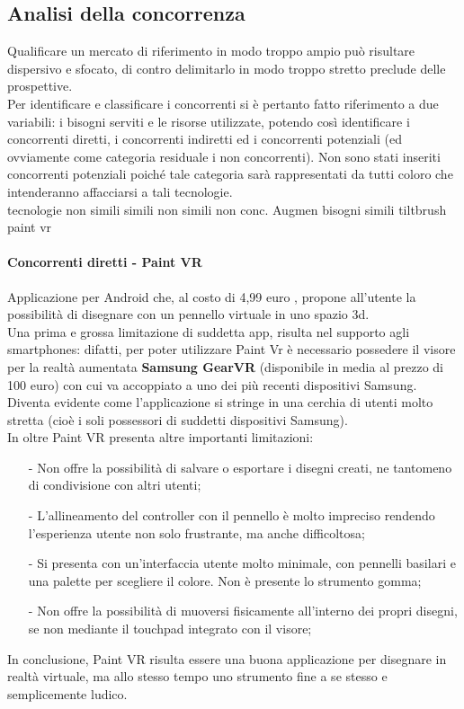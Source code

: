 \documentclass[11pt,fleqn]{book} %
\begin{document}
\subsection{Analisi della concorrenza}
Qualificare un mercato di riferimento in modo troppo ampio può risultare dispersivo e
sfocato, di contro delimitarlo in modo troppo stretto preclude delle prospettive. \\Per
identificare e classificare i concorrenti si è pertanto fatto riferimento a due variabili: i
bisogni serviti e le risorse utilizzate, potendo così identificare i concorrenti diretti, i
concorrenti indiretti ed i concorrenti potenziali (ed ovviamente come categoria residuale
i non concorrenti). Non sono stati inseriti concorrenti potenziali poiché tale categoria sarà
rappresentati da tutti coloro che intenderanno affacciarsi a tali tecnologie.\\
\newpage
						tecnologie
 			  	non simili		simili
	non simili	non conc.		Augmen								
bisogni
		simili	tiltbrush 		paint vr
	
				
\paragraph{Concorrenti diretti - Paint VR}
Applicazione per Android che, al costo di 4,99 euro , propone all'utente la possibilità di disegnare con un pennello virtuale in uno spazio 3d.\\
Una prima e grossa limitazione di suddetta app, risulta nel supporto agli smartphones: difatti, per poter utilizzare Paint Vr è necessario possedere il visore per la realtà aumentata \textbf{Samsung GearVR} (disponibile in media al prezzo di 100 euro) con cui va accoppiato a uno dei più recenti dispositivi Samsung. Diventa evidente come l'applicazione si stringe in una cerchia di utenti molto stretta (cioè i soli possessori di suddetti dispositivi Samsung).\\
In oltre Paint VR presenta altre importanti limitazioni: 
\begin{itemize}
\item[-] Non offre la possibilità di salvare o esportare i disegni creati, ne tantomeno di condivisione con altri utenti;
\item[-] L'allineamento del controller con il pennello è molto impreciso rendendo l'esperienza utente non solo frustrante, ma anche difficoltosa; 
\item[-] Si presenta con un'interfaccia utente molto minimale, con pennelli basilari e una palette per scegliere il colore. Non è presente lo strumento gomma;
\item[-] Non offre la possibilità di muoversi fisicamente all'interno dei propri disegni, se non mediante il touchpad integrato con il visore;
\end{itemize}
In conclusione, Paint VR risulta essere una buona applicazione per disegnare in realtà virtuale, ma allo stesso tempo uno strumento fine a se stesso e semplicemente ludico.
\end{document}
